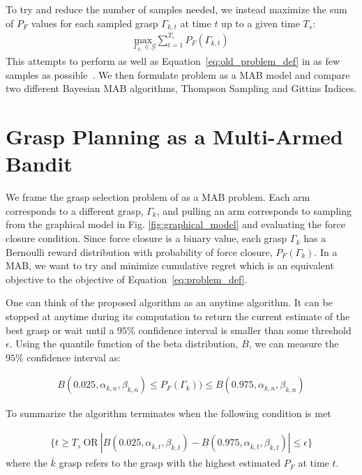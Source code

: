 \documentclass[10pt, conference]{ieeeconf}      %
\newcommand{\mG}{\mathcal{G}}
\begin{document}
To try and reduce the number of samples needed, we instead maximize the sum of $P_F$ values for each sampled grasp  $\Gamma_{k,t}$ at time $t$ up to a given time $T_s$:
\begin{align}
    \underset{\Gamma_{k,} \in \mG}{\text{max }} \sum \limits_{t=1}^
    {T_s} P_F \left( \Gamma_{k,t}\right)  \label{eq:problem_def}
\end{align}
\noindent This attempts to perform as well as Equation~\ref{eq:old_problem_def} in as few samples as possible~\cite{srinivas2009gaussian}. We then formulate  problem as a MAB model and compare two different Bayesian MAB algorithms, Thompson Sampling and Gittins Indices.

\section{Grasp Planning as a Multi-Armed Bandit}
We frame the grasp selection problem of  as a MAB problem.
Each arm corresponds to a different grasp, $\Gamma_k$, and pulling an arm corresponds to sampling from the graphical model in Fig. \ref{fig:graphical_model} and evaluating the force closure condition. Since force closure is a binary value, each grasp $\Gamma_k$ has a Bernoulli reward distribution with probability of force closure, $P_F(\Gamma_k)$.
In a MAB, we want to try and minimize cumulative regret which is an equivalent objective to the objective of Equation~\ref{eq:problem_def}.

One can think of the proposed algorithm as an anytime algorithm. It can be stopped at anytime during its computation to return the current estimate of the best grasp or wait until a $95\%$ confidence interval is smaller than some threshold $\epsilon$. Using the quantile function of the beta distribution, $B$, we can measure the $95\%$ confidence interval as: 

\vspace{-2ex}
\begin{align}\label{eq:confidence}
B(0.025,\alpha_{k,n},\beta_{k,n}) \leq P_F(\Gamma_k)) \leq B(0.975,\alpha_{k,n},\beta_{k,n})
\end{align}

To summarize the algorithm terminates when the following condition is met 

\vspace{-2ex}
\begin{align}\label{eq:stopping_condition}
\lbrace t \geq T_s \: \mbox{OR} \: |B(0.025,\alpha_{\bar{k},t},\beta_{\bar{k},t}) -  B(0.975,\alpha_{\bar{k},t},\beta_{\bar{k},t})| \leq \epsilon \rbrace
\end{align}
\noindent where the $\bar{k}$ grasp refers to the grasp with the highest estimated $P_F$ at time $t$. 
\end{document}
